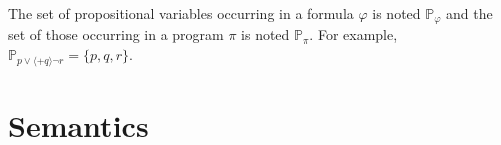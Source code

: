 \documentclass{llncs}
\newcommand{\assgntopV}[1]{{\mathtt {+} #1}}
\newcommand{\ldia}[1]{ \big\langle #1 \big\rangle}
\renewcommand{\phi}{\varphi}
\newcommand{\propset}{\mathbb P}
\newcommand{\propsetOf}[1]{\propset_{#1}}
\begin{document}
The set of propositional variables occurring in a formula $\phi$ 
is noted $\propsetOf \phi $ and 
the set of those occurring in a program $\pi$ is noted $\propsetOf \pi $. 
For example, $\propsetOf{ p \lor \ldia{\assgntopV{q} } \lnot r } = \{p,q,r\}$. 


\section{Semantics}\label{sec:interpretation} 

\end{document}
